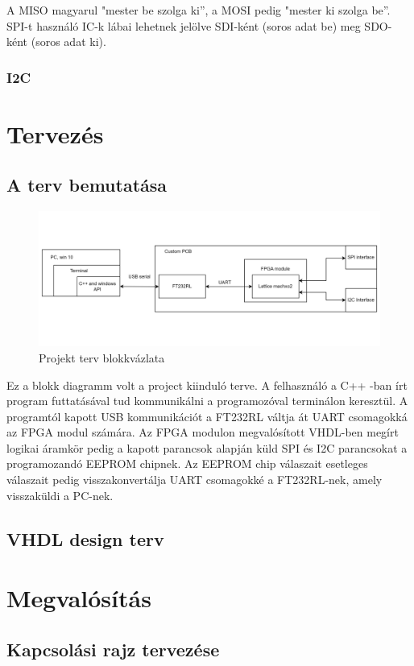 \documentclass[a4paper,12pt,oneside]{book}
\begin{document}
A MISO magyarul "mester be szolga ki”, a MOSI pedig "mester ki szolga be”. SPI-t használó IC-k lábai lehetnek jelölve SDI-ként (soros adat be) meg SDO-ként (soros adat ki). %
\subsection{I2C}
\chapter{Tervezés}
\section{A terv bemutatása}

\begin{figure}[H]
	\centering
	\includegraphics[trim=1mm 1mm 1mm 1mm,scale=0.245]{terv1.png}
	\caption{Projekt terv blokkvázlata}
	\label{Projekt terv}
\end{figure}
Ez a blokk diagramm volt a project kiinduló terve. A felhasználó a C++ -ban írt program futtatásával tud kommunikálni a programozóval terminálon keresztül. A programtól kapott  USB kommunikációt a FT232RL váltja át UART csomagokká az FPGA modul számára. Az FPGA modulon megvalósított VHDL-ben megírt logikai áramkör pedig a kapott parancsok alapján küld SPI és I2C parancsokat a programozandó EEPROM chipnek. Az EEPROM chip válaszait esetleges válaszait pedig visszakonvertálja UART csomagokké a FT232RL-nek, amely visszaküldi a PC-nek.
\section{VHDL design terv}
\chapter{Megvalósítás}

\section{Kapcsolási rajz tervezése}
\end{document}
